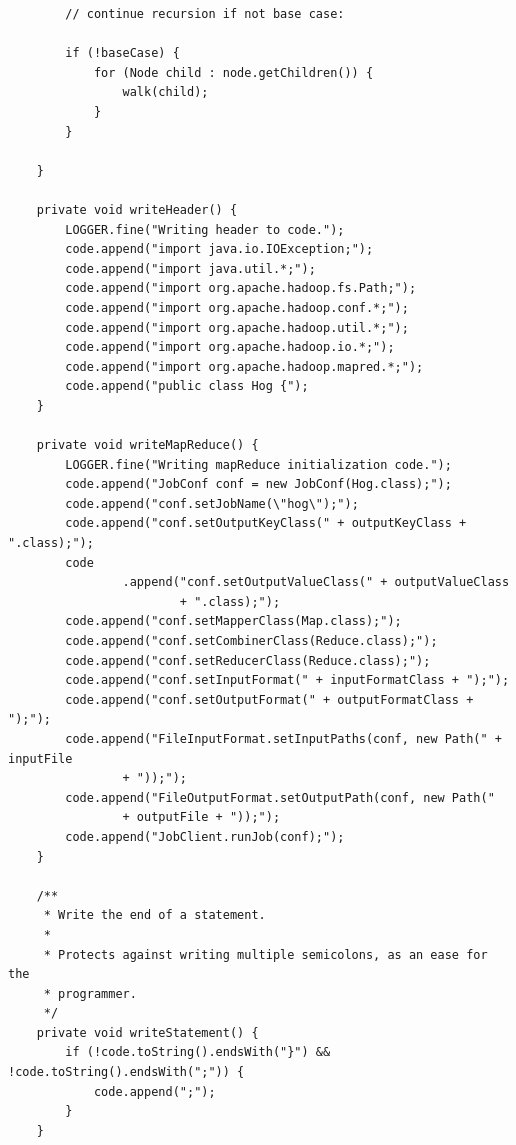 \documentclass{book}
\begin{document}
\begin{verbatim}
		// continue recursion if not base case:

		if (!baseCase) {
			for (Node child : node.getChildren()) {
				walk(child);
			}
		}

	}

	private void writeHeader() {
		LOGGER.fine("Writing header to code.");
		code.append("import java.io.IOException;");
		code.append("import java.util.*;");
		code.append("import org.apache.hadoop.fs.Path;");
		code.append("import org.apache.hadoop.conf.*;");
		code.append("import org.apache.hadoop.util.*;");
		code.append("import org.apache.hadoop.io.*;");
		code.append("import org.apache.hadoop.mapred.*;");
		code.append("public class Hog {");
	}

	private void writeMapReduce() {
		LOGGER.fine("Writing mapReduce initialization code.");
		code.append("JobConf conf = new JobConf(Hog.class);");
		code.append("conf.setJobName(\"hog\");");
		code.append("conf.setOutputKeyClass(" + outputKeyClass + ".class);");
		code
				.append("conf.setOutputValueClass(" + outputValueClass
						+ ".class);");
		code.append("conf.setMapperClass(Map.class);");
		code.append("conf.setCombinerClass(Reduce.class);");
		code.append("conf.setReducerClass(Reduce.class);");
		code.append("conf.setInputFormat(" + inputFormatClass + ");");
		code.append("conf.setOutputFormat(" + outputFormatClass + ");");
		code.append("FileInputFormat.setInputPaths(conf, new Path(" + inputFile
				+ "));");
		code.append("FileOutputFormat.setOutputPath(conf, new Path("
				+ outputFile + "));");
		code.append("JobClient.runJob(conf);");
	}

	/**
	 * Write the end of a statement.
	 * 
	 * Protects against writing multiple semicolons, as an ease for the
	 * programmer.
	 */
	private void writeStatement() {
		if (!code.toString().endsWith("}") && !code.toString().endsWith(";")) {
			code.append(";");
		}
	}


\end{verbatim}
\end{document}
